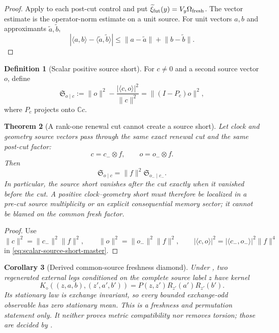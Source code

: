 \documentclass[11pt]{article}
\newtheorem{theorem}{Theorem}[section]
\newtheorem{corollary}[theorem]{Corollary}
\theoremstyle{definition}
\newtheorem{definition}[theorem]{Definition}
\theoremstyle{remark}
\newcommand{\C}{\mathbb C}
\newcommand{\norm}[1]{\lVert#1\rVert}
\begin{document}
\begin{proof}
Apply  to each post-cut control and
put $\widetilde\xi_{\rm fut}(y)=V_y\Omega_{\rm fresh}$.  The vector estimate is
the operator-norm estimate on a unit source.  For unit vectors $a,b$ and
approximants $\widetilde a,\widetilde b$,
\[
  |\langle a,b\rangle-\langle\widetilde a,\widetilde b\rangle|
  \le\norm{a-\widetilde a}+\norm{b-\widetilde b}.
\]
\end{proof}

\begin{definition}[Scalar positive source short]
\label{def:scalar-source-short-master}
For $c\ne0$ and a second source vector $o$, define
\begin{equation}
  \mathfrak S_{o\mid c}
  :=\norm{o}^2-
  \frac{|\langle c,o\rangle|^2}{\norm c^2}
  =\norm{(I-P_c)o}^2,
  \label{eq:scalar-source-short-master}
\end{equation}
where $P_c$ projects onto $\C c$.
\end{definition}

\begin{theorem}[A rank-one renewal cut cannot create a source short]
\label{thm:cut-source-short-master}
Let clock and geometry source vectors pass through the same exact renewal cut
and the same post-cut factor:
\[
  c=c_-\otimes f,
  \qquad
  o=o_-\otimes f.
\]
Then
\begin{equation}
  \boxed{
  \mathfrak S_{o\mid c}
  =\norm f^2\mathfrak S_{o_-\mid c_-}.}
  \label{eq:cut-source-short-master}
\end{equation}
In particular, the source short vanishes after the cut exactly when it vanished
before the cut.  A positive clock--geometry short must therefore be localized
in a pre-cut source multiplicity or an explicit consequential memory sector;
it cannot be blamed on the common fresh factor.
\end{theorem}

\begin{proof}
Use
\[
  \norm c^2=\norm{c_-}^2\norm f^2,
  \qquad
  \norm o^2=\norm{o_-}^2\norm f^2,
  \qquad
  |\langle c,o\rangle|^2
  =|\langle c_-,o_-\rangle|^2\norm f^4
\]
in \eqref{eq:scalar-source-short-master}.
\end{proof}


\begin{corollary}[Derived common-source freshness diamond]
\label{cor:derived-fresh-diamond-master}
Under , two regenerated external legs conditioned
on the complete source label $z$ have kernel
\[
 \boxed{
 K_\diamond((z,a,b),(z',a',b'))
 =P(z,z')R_{z'}(a')R_{z'}(b').}
\]
Its stationary law is exchange invariant, so every bounded exchange-odd
observable has zero stationary mean.  This is a freshness and permutation
statement only.  It neither proves metric compatibility nor removes torsion;
those are decided by .
\end{corollary}
\end{document}
